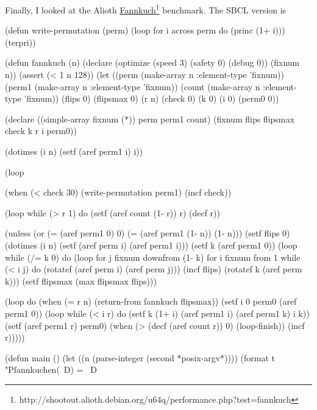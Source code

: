 Finally, I looked at the Alioth
\underline{Fannkuch}\footnote{http://shootout.alioth.debian.org/u64q/performance.php?test=fannkuch}
benchmark. The SBCL version is
\begin{wideverbatim}
   (defun write-permutation (perm)
     (loop for i across perm do
      (princ (1+ i)))
     (terpri))

   (defun fannkuch (n)
     (declare (optimize (speed 3) (safety 0) (debug 0)) (fixnum n))
     (assert (< 1 n 128))
     (let ((perm (make-array n :element-type 'fixnum))
           (perm1 (make-array n :element-type 'fixnum))
           (count (make-array n :element-type 'fixnum))
           (flips 0) (flipsmax 0) (r n) (check 0) (k 0)
      (i 0) (perm0 0))

       (declare ((simple-array fixnum (*)) perm perm1 count)
                (fixnum flips flipsmax check k r i perm0))

       (dotimes (i n) (setf (aref perm1 i) i))

       (loop

        (when (< check 30)
          (write-permutation perm1)
          (incf check))

        (loop while (> r 1) do
              (setf (aref count (1- r)) r)
              (decf r))

        (unless (or (= (aref perm1 0) 0)
          (= (aref perm1 (1- n)) (1- n)))
          (setf flips 0)
          (dotimes (i n) (setf (aref perm i) (aref perm1 i)))
          (setf k (aref perm1 0))
          (loop while (/= k 0) do
                (loop for j fixnum downfrom (1- k)
                      for i fixnum from 1
                      while (< i j) do (rotatef (aref perm i) (aref perm j)))
                (incf flips)
                (rotatef k (aref perm k)))
          (setf flipsmax (max flipsmax flips)))

        (loop do
         (when (= r n)
           (return-from fannkuch flipsmax))
         (setf i 0 perm0 (aref perm1 0))
         (loop while (< i r) do
          (setf k (1+ i)
                (aref perm1 i) (aref perm1 k)
                i k))
         (setf (aref perm1 r) perm0)
         (when (> (decf (aref count r)) 0) (loop-finish))
         (incf r)))))

\end{wideverbatim}

\begin{wideverbatim}

   (defun main ()
     (let ((n (parse-integer (second *posix-argv*))))
       (format t "Pfannkuchen(~D) = ~D~%
\end{wideverbatim}

